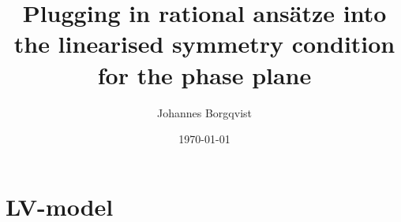 \documentclass[12pt]{article}
\theoremstyle{definition}
\theoremstyle{remark}
\begin{document}
\title{\textbf{Plugging in rational ans\"atze into the linearised symmetry condition for the phase plane}}
\author{Johannes Borgqvist}
\date{\today}
\maketitle
\tableofcontents
\clearpage
\section{LV-model}

\end{document}
